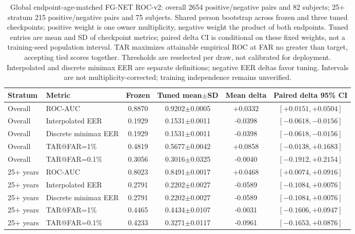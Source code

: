 \documentclass[journal]{IEEEtran}
\begin{document}
\begin{table}[!t]
\caption{Global endpoint-age-matched FG-NET ROC-v2: overall 2654 positive/negative pairs and 82 subjects; 25+ stratum 215 positive/negative pairs and 75 subjects. Shared person bootstrap across frozen and three tuned checkpoints; positive weight is one owner multiplicity, negative weight the product of both endpoints. Tuned entries are mean and SD of checkpoint metrics; paired delta CI is conditional on these fixed weights, not a training-seed population interval. TAR maximizes attainable empirical ROC at FAR no greater than target, accepting tied scores together. Thresholds are reselected per draw, not calibrated for deployment. Interpolated and discrete minimax EER are separate definitions; negative EER deltas favor tuning. Intervals are not multiplicity-corrected; training independence remains unverified.}
\label{tab:fgnet-roc-v2}
\centering\footnotesize
\begin{tabular}{@{}llcccc@{}}
\toprule
Stratum & Metric & Frozen & Tuned mean$\pm$SD & Mean delta & Paired delta 95\% CI \\
\midrule
Overall & ROC-AUC & 0.8870 & 0.9202$\pm$0.0005 & +0.0332 & $[+0.0151,+0.0504]$ \\
Overall & Interpolated EER & 0.1929 & 0.1531$\pm$0.0011 & -0.0398 & $[-0.0618,-0.0156]$ \\
Overall & Discrete minimax EER & 0.1929 & 0.1531$\pm$0.0011 & -0.0398 & $[-0.0618,-0.0156]$ \\
Overall & TAR@FAR=1\% & 0.4819 & 0.5677$\pm$0.0042 & +0.0858 & $[-0.0138,+0.1683]$ \\
Overall & TAR@FAR=0.1\% & 0.3056 & 0.3016$\pm$0.0325 & -0.0040 & $[-0.1912,+0.2154]$ \\
25+ years & ROC-AUC & 0.8023 & 0.8491$\pm$0.0017 & +0.0468 & $[+0.0074,+0.0916]$ \\
25+ years & Interpolated EER & 0.2791 & 0.2202$\pm$0.0027 & -0.0589 & $[-0.1084,+0.0076]$ \\
25+ years & Discrete minimax EER & 0.2791 & 0.2202$\pm$0.0027 & -0.0589 & $[-0.1084,+0.0076]$ \\
25+ years & TAR@FAR=1\% & 0.4465 & 0.4434$\pm$0.0107 & -0.0031 & $[-0.1606,+0.0947]$ \\
25+ years & TAR@FAR=0.1\% & 0.4233 & 0.3271$\pm$0.0117 & -0.0961 & $[-0.1653,+0.0876]$ \\
\bottomrule
\end{tabular}
\end{table}
\end{document}

